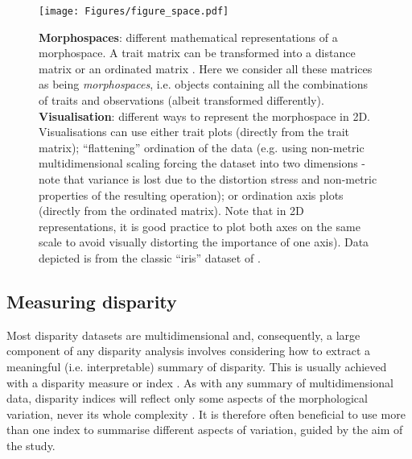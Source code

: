 \documentclass[12pt,letterpaper]{article}
\begin{document}
\begin{figure}[!htbp]
\centering
   \texttt{[image: Figures/figure\_space.pdf]}
\caption{
    \tiny{
    \textbf{Morphospaces}: different mathematical representations of a morphospace. A trait matrix can be transformed into a distance matrix \citep[e.g in][]{Close2015} or an ordinated matrix \citep[e.g. in][]{tyler2011detecting}.
    Here we consider all these matrices as being \textit{morphospaces}, i.e. objects containing all the combinations of traits and observations (albeit transformed differently).
    \textbf{Visualisation}: different  ways to represent the morphospace in 2D.
    Visualisations can use either trait plots (directly from the trait matrix); ``flattening'' ordination of the data (e.g. using non-metric multidimensional scaling forcing the dataset into two dimensions - note that variance is lost due to the distortion stress and non-metric properties of the resulting operation); or ordination axis plots (directly from the ordinated matrix).
    Note that in 2D representations, it is good practice to plot both axes on the same scale to avoid visually distorting the importance of one axis). Data depicted is from the classic ``iris'' dataset of \citep{edgar1935irises,fisher1936use}.
    }
}
\label{Fig:morphospace}
\end{figure}

\subsection{Measuring disparity} \label{section:metrics}

Most disparity datasets are multidimensional and, consequently, a large component of any disparity analysis involves considering how to extract a meaningful (i.e.
interpretable) summary of disparity.
This is usually achieved with a disparity measure or index \citep{Hopkins2017}.
As with any summary of multidimensional data, disparity indices will reflect only some aspects of the morphological variation, never its whole complexity \citep{GuillermeMOMS}.
It is therefore often beneficial to use more than one index to summarise different aspects of variation, guided by the aim of the study.
\end{document}
